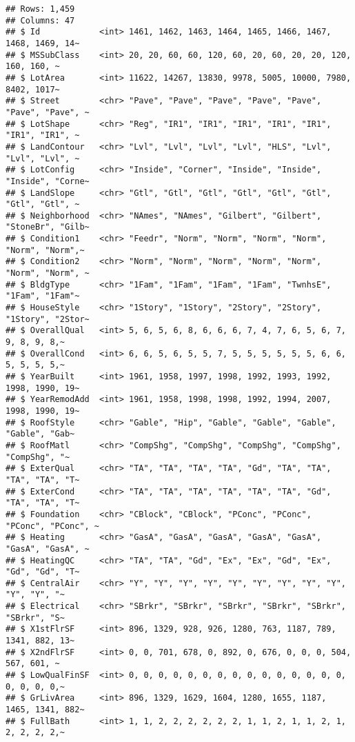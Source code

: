 \documentclass[
]{article}
\begin{document}
\begin{verbatim}
## Rows: 1,459
## Columns: 47
## $ Id            <int> 1461, 1462, 1463, 1464, 1465, 1466, 1467, 1468, 1469, 14~
## $ MSSubClass    <int> 20, 20, 60, 60, 120, 60, 20, 60, 20, 20, 120, 160, 160, ~
## $ LotArea       <int> 11622, 14267, 13830, 9978, 5005, 10000, 7980, 8402, 1017~
## $ Street        <chr> "Pave", "Pave", "Pave", "Pave", "Pave", "Pave", "Pave", ~
## $ LotShape      <chr> "Reg", "IR1", "IR1", "IR1", "IR1", "IR1", "IR1", "IR1", ~
## $ LandContour   <chr> "Lvl", "Lvl", "Lvl", "Lvl", "HLS", "Lvl", "Lvl", "Lvl", ~
## $ LotConfig     <chr> "Inside", "Corner", "Inside", "Inside", "Inside", "Corne~
## $ LandSlope     <chr> "Gtl", "Gtl", "Gtl", "Gtl", "Gtl", "Gtl", "Gtl", "Gtl", ~
## $ Neighborhood  <chr> "NAmes", "NAmes", "Gilbert", "Gilbert", "StoneBr", "Gilb~
## $ Condition1    <chr> "Feedr", "Norm", "Norm", "Norm", "Norm", "Norm", "Norm",~
## $ Condition2    <chr> "Norm", "Norm", "Norm", "Norm", "Norm", "Norm", "Norm", ~
## $ BldgType      <chr> "1Fam", "1Fam", "1Fam", "1Fam", "TwnhsE", "1Fam", "1Fam"~
## $ HouseStyle    <chr> "1Story", "1Story", "2Story", "2Story", "1Story", "2Stor~
## $ OverallQual   <int> 5, 6, 5, 6, 8, 6, 6, 6, 7, 4, 7, 6, 5, 6, 7, 9, 8, 9, 8,~
## $ OverallCond   <int> 6, 6, 5, 6, 5, 5, 7, 5, 5, 5, 5, 5, 5, 6, 6, 5, 5, 5, 5,~
## $ YearBuilt     <int> 1961, 1958, 1997, 1998, 1992, 1993, 1992, 1998, 1990, 19~
## $ YearRemodAdd  <int> 1961, 1958, 1998, 1998, 1992, 1994, 2007, 1998, 1990, 19~
## $ RoofStyle     <chr> "Gable", "Hip", "Gable", "Gable", "Gable", "Gable", "Gab~
## $ RoofMatl      <chr> "CompShg", "CompShg", "CompShg", "CompShg", "CompShg", "~
## $ ExterQual     <chr> "TA", "TA", "TA", "TA", "Gd", "TA", "TA", "TA", "TA", "T~
## $ ExterCond     <chr> "TA", "TA", "TA", "TA", "TA", "TA", "Gd", "TA", "TA", "T~
## $ Foundation    <chr> "CBlock", "CBlock", "PConc", "PConc", "PConc", "PConc", ~
## $ Heating       <chr> "GasA", "GasA", "GasA", "GasA", "GasA", "GasA", "GasA", ~
## $ HeatingQC     <chr> "TA", "TA", "Gd", "Ex", "Ex", "Gd", "Ex", "Gd", "Gd", "T~
## $ CentralAir    <chr> "Y", "Y", "Y", "Y", "Y", "Y", "Y", "Y", "Y", "Y", "Y", "~
## $ Electrical    <chr> "SBrkr", "SBrkr", "SBrkr", "SBrkr", "SBrkr", "SBrkr", "S~
## $ X1stFlrSF     <int> 896, 1329, 928, 926, 1280, 763, 1187, 789, 1341, 882, 13~
## $ X2ndFlrSF     <int> 0, 0, 701, 678, 0, 892, 0, 676, 0, 0, 0, 504, 567, 601, ~
## $ LowQualFinSF  <int> 0, 0, 0, 0, 0, 0, 0, 0, 0, 0, 0, 0, 0, 0, 0, 0, 0, 0, 0,~
## $ GrLivArea     <int> 896, 1329, 1629, 1604, 1280, 1655, 1187, 1465, 1341, 882~
## $ FullBath      <int> 1, 1, 2, 2, 2, 2, 2, 2, 1, 1, 2, 1, 1, 2, 1, 2, 2, 2, 2,~

\end{verbatim}
\end{document}
